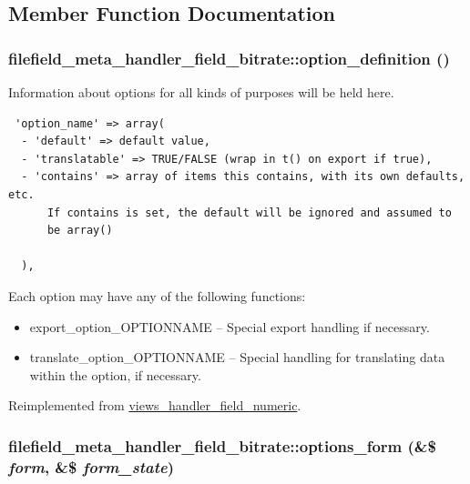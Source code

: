 \subsection{Member Function Documentation}
\hypertarget{classfilefield__meta__handler__field__bitrate_678b8ef891e4b4024d22e2b914e20b15}{
\subsubsection[{option\_\-definition}]{\setlength{\rightskip}{0pt plus 5cm}filefield\_\-meta\_\-handler\_\-field\_\-bitrate::option\_\-definition ()}}
\label{classfilefield__meta__handler__field__bitrate_678b8ef891e4b4024d22e2b914e20b15}


Information about options for all kinds of purposes will be held here. 

\begin{Code}\begin{verbatim} 'option_name' => array(
  - 'default' => default value,
  - 'translatable' => TRUE/FALSE (wrap in t() on export if true),
  - 'contains' => array of items this contains, with its own defaults, etc.
      If contains is set, the default will be ignored and assumed to
      be array()

  ),
\end{verbatim}
\end{Code}

 Each option may have any of the following functions:\begin{itemize}
\item export\_\-option\_\-OPTIONNAME -- Special export handling if necessary.\item translate\_\-option\_\-OPTIONNAME -- Special handling for translating data within the option, if necessary. \end{itemize}


Reimplemented from \hyperlink{classviews__handler__field__numeric_ab74a55c8b3c564ee995e210a503947b}{views\_\-handler\_\-field\_\-numeric}.\hypertarget{classfilefield__meta__handler__field__bitrate_74c60e6bbcee2bbaed721a9ed7eea05c}{
\subsubsection[{options\_\-form}]{\setlength{\rightskip}{0pt plus 5cm}filefield\_\-meta\_\-handler\_\-field\_\-bitrate::options\_\-form (\&\$ {\em form}, \/  \&\$ {\em form\_\-state})}}
\label{classfilefield__meta__handler__field__bitrate_74c60e6bbcee2bbaed721a9ed7eea05c}


